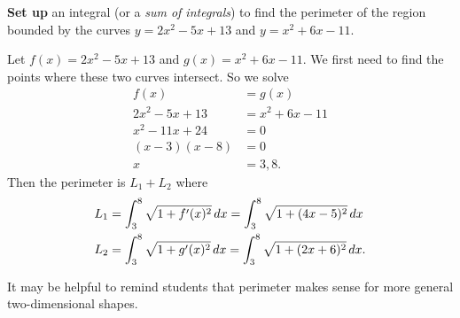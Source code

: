 \documentclass[handout,instructornotes]{ximera}
\begin{document}
\begin{problem}
{\bf Set up} an integral (or a {\it sum of integrals}) to find the perimeter of the region bounded by the curves $y=2x^2-5x+13$ and $y=x^2+6x-11$.
	\begin{freeResponse}
	Let $f(x) = 2x^2-5x+13$ and $g(x) = x^2+6x-11$.
	We first need to find the points where these two curves intersect.  
	So we solve
		\begin{align*}
		f(x) &= g(x)  \\
		2x^2-5x+13 &= x^2+6x-11  \\
		x^2-11x+24 &= 0  \\
		(x-3)(x-8) &= 0  \\
		x &= 3,8.
		\end{align*}
	Then the perimeter is $L_1 + L_2$ where
		\begin{align*}
		L_1 &= \int_3^8 \sqrt{1+f'(x)^2} \,d x = \int_3^8 \sqrt{1+(4x-5)^2} \,d x  \\
		L_2 &= \int_3^8 \sqrt{1+g'(x)^2} \,d x = \int_3^8 \sqrt{1+(2x+6)^2} \,d x.
		\end{align*}	
	\end{freeResponse}
	
\end{problem}

\begin{instructorNotes}
It may be helpful to remind students that perimeter makes sense for more general two-dimensional shapes.
\end{instructorNotes}
\end{document}
